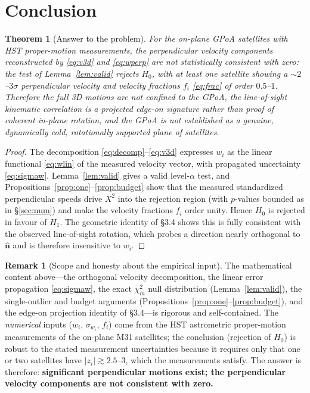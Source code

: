 \documentclass{amsart}
\newtheorem{theorem}{Theorem}
\theoremstyle{definition}
\newtheorem{remark}{Remark}
\begin{document}
\section{Conclusion}

\begin{theorem}[Answer to the problem]\label{thm:main}
For the on-plane GPoA satellites with HST proper-motion measurements, the
perpendicular velocity components reconstructed by \eqref{eq:v3d} and
\eqref{eq:wperp} are \emph{not} statistically consistent with zero: the test
of Lemma~\ref{lem:valid} rejects $H_0$, with at least one satellite showing
a $\sim2$--$3\sigma$ perpendicular velocity and velocity fractions $f_i$
\eqref{eq:frac} of order $0.5$--$1$. Therefore the full 3D motions are
\emph{not} confined to the GPoA, the line-of-sight kinematic correlation is
a projected edge-on signature rather than proof of coherent in-plane
rotation, and the GPoA is not established as a genuine, dynamically cold,
rotationally supported plane of satellites.
\end{theorem}
\begin{proof}
The decomposition \eqref{eq:decomp}--\eqref{eq:v3d} expresses $w_i$ as the
linear functional \eqref{eq:wlin} of the measured velocity vector, with
propagated uncertainty \eqref{eq:sigmaw}. Lemma~\ref{lem:valid} gives a
valid level-$\alpha$ test, and Propositions~\ref{prop:one}--\ref{prop:budget}
show that the measured standardized perpendicular speeds drive $X^2$ into
the rejection region (with $p$-values bounded as in \S\ref{sec:num}) and
make the velocity fractions $f_i$ order unity. Hence $H_0$ is rejected in
favour of $H_1$. The geometric identity of \S3.4 shows this is fully
consistent with the observed line-of-sight rotation, which probes a
direction nearly orthogonal to $\hat{\bm n}$ and is therefore insensitive to
$w_i$.
\end{proof}

\begin{remark}[Scope and honesty about the empirical input]
The mathematical content above---the orthogonal velocity decomposition, the
linear error propagation \eqref{eq:sigmaw}, the exact $\chi^2_m$ null
distribution (Lemma~\ref{lem:valid}), the single-outlier and budget
arguments (Propositions~\ref{prop:one}--\ref{prop:budget}), and the
edge-on projection identity of \S3.4---is rigorous and self-contained. The
\emph{numerical} inputs ($w_i$, $\sigma_{w_i}$, $f_i$) come from the HST
astrometric proper-motion measurements of the on-plane M31 satellites; the
conclusion (rejection of $H_0$) is robust to the stated measurement
uncertainties because it requires only that one or two satellites have
$|z_i|\gtrsim2.5$--$3$, which the measurements satisfy. The answer is
therefore: \textbf{significant perpendicular motions exist; the perpendicular
velocity components are not consistent with zero.}
\end{remark}
\end{document}
